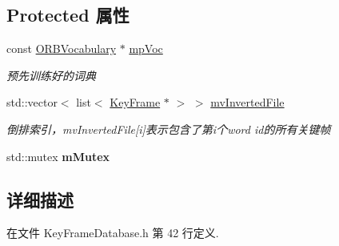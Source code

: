 \subsection*{Protected 属性}
\begin{DoxyCompactItemize}
\item 
\hypertarget{classORB__SLAM2_1_1KeyFrameDatabase_ad11a653313a5f0ef6f6fbc4880df0b7d}{const \hyperlink{classDBoW2_1_1TemplatedVocabulary}{O\-R\-B\-Vocabulary} $\ast$ \hyperlink{classORB__SLAM2_1_1KeyFrameDatabase_ad11a653313a5f0ef6f6fbc4880df0b7d}{mp\-Voc}}\label{classORB__SLAM2_1_1KeyFrameDatabase_ad11a653313a5f0ef6f6fbc4880df0b7d}

\begin{DoxyCompactList}\small\item\em 预先训练好的词典 \end{DoxyCompactList}\item 
\hypertarget{classORB__SLAM2_1_1KeyFrameDatabase_a3b6d73823fcd1b96f3ba5a66be0b2227}{std\-::vector$<$ list$<$ \hyperlink{classORB__SLAM2_1_1KeyFrame}{Key\-Frame} $\ast$ $>$ $>$ \hyperlink{classORB__SLAM2_1_1KeyFrameDatabase_a3b6d73823fcd1b96f3ba5a66be0b2227}{mv\-Inverted\-File}}\label{classORB__SLAM2_1_1KeyFrameDatabase_a3b6d73823fcd1b96f3ba5a66be0b2227}

\begin{DoxyCompactList}\small\item\em 倒排索引，mv\-Inverted\-File\mbox{[}i\mbox{]}表示包含了第i个word id的所有关键帧 \end{DoxyCompactList}\item 
\hypertarget{classORB__SLAM2_1_1KeyFrameDatabase_a31fc30f1474b8c97d81c96135e6912a1}{std\-::mutex {\bfseries m\-Mutex}}\label{classORB__SLAM2_1_1KeyFrameDatabase_a31fc30f1474b8c97d81c96135e6912a1}

\end{DoxyCompactItemize}


\subsection{详细描述}


在文件 Key\-Frame\-Database.\-h 第 42 行定义.



